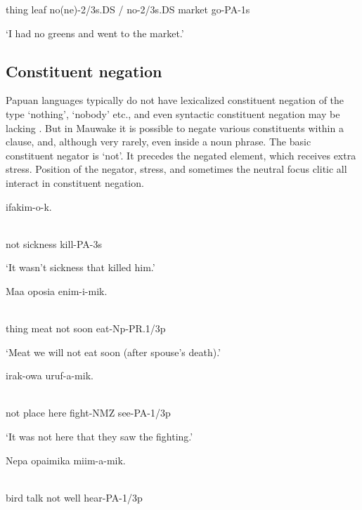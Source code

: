 thing  leaf  no(ne)-2/3s.DS  /  no-2/3s.DS  market  go-PA-1s

`I had no greens and went to the market.'

\subsection{Constituent negation}
\hypertarget{RefHeading22421935131865}{}
Papuan languages typically do not have lexicalized constituent negation of the type `nothing', `nobody' etc., and even syntactic constituent negation may be lacking \citep[271-2]{Reesink1987}. But in Mauwake it is possible to negate various constituents within a clause, and, although very rarely, even inside a noun phrase. The basic constituent negator is  `not'. It precedes the negated element, which receives extra stress. Position of the negator, stress, and sometimes the neutral focus clitic all interact in constituent negation.

\ea%
\label{ex:x1102}
\gll {}    ifakim-o-k. \\
      \\
\glt
\z

not  sickness  kill-PA-3s

`It wasn't sickness that killed him.'

\ea%
\label{ex:x1103}
\gll Maa  oposia    enim-i-mik. \\
      \\
\glt
\z

thing  meat  not  soon  eat-Np-PR.1/3p

`Meat we will not eat soon (after spouse's death).'

\ea%
\label{ex:x1108}
\gll {}  irak-owa  uruf-a-mik. \\
      \\
\glt
\z

not  place  here  fight-NMZ  see-PA-1/3p

`It was not here that they saw the fighting.'

\ea%
\label{ex:x1104}
\gll Nepa  opaimika    miim-a-mik. \\
      \\
\glt
\z

bird  talk  not  well  hear-PA-1/3p

